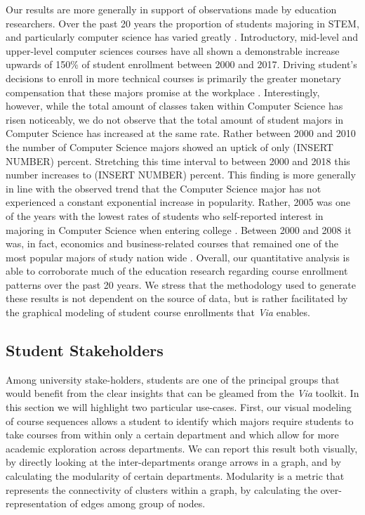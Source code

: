 \documentclass{sigchi}
\begin{document}
Our results are more generally in support of observations made by education researchers. Over the past 20 years the proportion of students majoring in STEM, and particularly computer science has varied greatly \cite{ComputingResearchAssociation2017}. Introductory, mid-level and upper-level computer sciences courses have all shown a demonstrable increase upwards of 150\% of student enrollment between 2000 and 2017. Driving student's decisions to enroll in more technical courses is primarily the greater monetary compensation that these majors promise at the workplace \cite{Downey2007}. Interestingly, however, while the total amount of classes taken within Computer Science has risen noticeably, we do not observe that the total amount of student majors in Computer Science has increased at the same rate. Rather between 2000 and 2010 the number of Computer Science majors showed an uptick of only (INSERT NUMBER) percent. Stretching this time interval to between 2000 and 2018 this number increases to (INSERT NUMBER) percent. This finding is more generally in line with the observed trend that the Computer Science major has not experienced a constant exponential increase in popularity. Rather, 2005 was one of the years with the lowest rates of students who self-reported interest in majoring in Computer Science when entering college \cite{Patterson2005}. Between 2000 and 2008 it was, in fact, economics and business-related courses that remained one of the most popular majors of study nation wide \cite{NationalCenterforEducation2018}. Overall, our quantitative analysis is able to corroborate much of the education research regarding course enrollment patterns over the past 20 years. We stress that the methodology used to generate these results is not dependent on the source of data, but is rather facilitated by the graphical modeling of student course enrollments that \textit{Via} enables.

\subsection{Student Stakeholders}
\label{sec:student_stakeholders}
Among university stake-holders, students are one of the principal groups that would benefit from the clear insights that can be gleamed from the \textit{Via} toolkit. In this section we will highlight two particular use-cases. First, our visual modeling of course sequences allows a student to identify which majors require students to take courses from within only a certain department and which allow for more academic exploration across departments. We can report this result both visually, by directly looking at the inter-departments orange arrows in a graph, and by calculating the modularity of certain departments. Modularity is a metric that represents the connectivity of clusters within a graph, by calculating the over-representation of edges among group of nodes.
\end{document}

